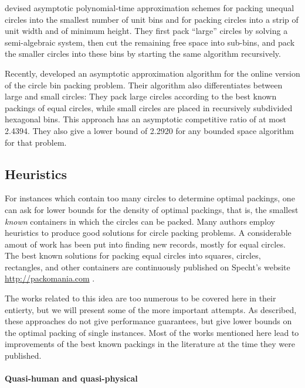 \documentclass[a4paper,style=print,oneside,bibliography=totoc,nexus,lnum,extramargin]{tubsbook}
\begin{document}
\textcite{MPSSW2014polynomial} devised asymptotic polynomial-time approximation schemes for packing unequal circles into the smallest number of unit bins and for packing circles into a strip of unit width and of minimum height. They first pack “large” circles by solving a semi-algebraic system, then cut the remaining free space into sub-bins, and pack the smaller circles into these bins by starting the same algorithm recursively.

Recently, \textcite{HMS2016bounded} developed an asymptotic approximation algorithm for the online version of the circle bin packing problem.
Their algorithm also differentiates between large and small circles: They pack large circles according to the best known packings of equal circles, while small circles are placed in recursively subdivided hexagonal bins. This approach has an asymptotic competitive ratio of at most 2.4394. They also give a lower bound of 2.2920 for any bounded space algorithm for that problem.

\subsection{Heuristics}

For instances which contain too many circles to determine optimal packings, one can ask for lower bounds for the density of optimal packings, that is, the smallest \emph{known} containers in which the circles can be packed.
Many authors employ heuristics to produce good solutions for circle packing problems.
A considerable amout of work has been put into finding new records, mostly for equal circles. The best known solutions for packing equal circles into squares, circles, rectangles, and other containers are continuously published on Specht's website \url{http://packomania.com} \cite{specht2015packomania}.

The works related to this idea are too numerous to be covered here in their entierty, but we will present some of the more important attempts. As described, these approaches do not give performance guarantees, but give lower bounds on the optimal packing of single instances. Most of the works mentioned here lead to improvements of the best known packings in the literature at the time they were published.

\paragraph{Quasi-human and quasi-physical}
\end{document}
